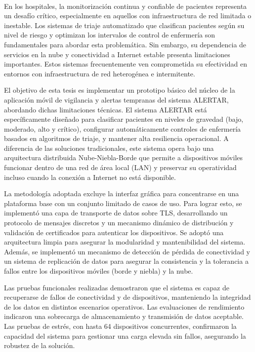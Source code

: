 \label{pagresum}
\\
\ \\
\ \\

\ \\

\ \\
\ \\

En los hospitales, la monitorización continua y confiable de pacientes representa un desafío crítico, especialmente en aquellos con infraestructura de red limitada o inestable. Los sistemas de triaje automatizado que clasifican pacientes según su nivel de riesgo y optimizan los intervalos de control de enfermería son fundamentales para abordar esta problemática. Sin embargo, su dependencia de servicios en la nube y conectividad a Internet estable presenta limitaciones importantes. Estos sistemas frecuentemente ven comprometida su efectividad en entornos con infraestructura de red heterogénea e intermitente. 

El objetivo de esta tesis es implementar un prototipo básico del núcleo de la aplicación móvil de vigilancia y alertas tempranas del sistema ALERTAR, abordando dichas limitaciones técnicas. El sistema ALERTAR está específicamente diseñado para clasificar pacientes en niveles de gravedad (bajo, moderado, alto y crítico), configurar automáticamente controles de enfermería basados en algoritmos de triaje, y mantener alta resiliencia operacional. A diferencia de las soluciones tradicionales, este sistema opera bajo una arquitectura distribuida Nube-Niebla-Borde que permite a dispositivos móviles funcionar dentro de una red de área local (LAN) y preservar su operatividad incluso cuando la conexión a Internet no está disponible.

La metodología adoptada excluye la interfaz gráfica para concentrarse en una plataforma base con un conjunto limitado de casos de uso. Para lograr esto, se implementó una capa de transporte de datos sobre TLS, desarrollando un protocolo de mensajes discretos y un mecanismo dinámico de distribución y validación de certificados para autenticar los dispositivos. Se adoptó una arquitectura limpia para asegurar la modularidad y mantenibilidad del sistema. Además, se implementó un mecanismo de detección de pérdida de conectividad y un sistema de replicación de datos para asegurar la consistencia y la tolerancia a fallos entre los dispositivos móviles (borde y niebla) y la nube.

Las pruebas funcionales realizadas demostraron que el sistema es capaz de recuperarse de fallos de conectividad y de dispositivos, manteniendo la integridad de los datos en distintos escenarios operativos. Las evaluaciones de rendimiento indicaron una sobrecarga de almacenamiento y transmisión de datos aceptable. Las pruebas de estrés, con hasta 64 dispositivos concurrentes, confirmaron la capacidad del sistema para gestionar una carga elevada sin fallos, asegurando la robustez de la solución.


